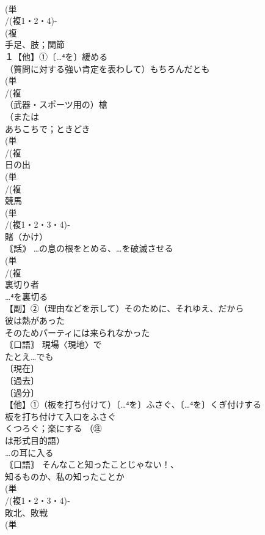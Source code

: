 \documentclass[8pt]{extreport}
\begin{document}
\begin{CJK}{UTF8}{min}
\\	(単
\\	/(複1・2・4)-
\\	(複
\\	手足、肢；関節
\\	１【他】①〔…⁴を〕緩める 
\\	（質問に対する強い肯定を表わして）もちろんだとも
\\	(単
\\	/(複
\\	（武器・スポーツ用の）槍 
\\	（または
\\	あちこちで；ときどき
\\	(単
\\	/(複
\\	日の出 
\\	(単
\\	/(複
\\	競馬 
\\	(単
\\	/(複1・2・3・4)‐
\\	賭（かけ） 
\\	｟話｠ …の息の根をとめる、…を破滅させる
\\	(単
\\	/(複
\\	裏切り者 
\\	…⁴を裏切る
\\	【副】②（理由などを示して）そのために、それゆえ、だから 
\\	彼は熱があった
\\	そのためパーティには来られなかった 
\\	｟口語｠ 現場〈現地〉で
\\	たとえ…でも
\\	〔現在〕
\\	〔過去〕
\\	〔過分〕
\\	【他】①（板を打ち付けて）〔…⁴を〕ふさぐ、〔…⁴を〕くぎ付けする 
\\	板を打ち付けて入口をふさぐ
\\	くつろぐ；楽にする （㊟
\\	は形式目的語）
\\	…の耳に入る
\\	｟口語｠ そんなこと知ったことじゃない！、
\\	知るものか、私の知ったことか
\\	(単
\\	/(複1・2・3・4)‐
\\	敗北、敗戦 
\\	(単

\end{CJK}
\end{document}
